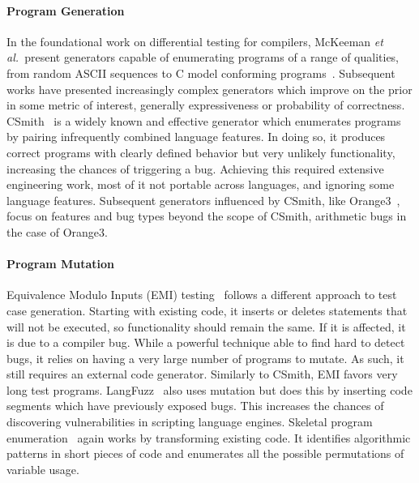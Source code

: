 \paragraph{Program Generation}

In the foundational work on differential testing for compilers, McKeeman \emph{et al.\ }present generators capable of enumerating programs of a range of qualities, from random ASCII sequences to C model conforming programs~\cite{McKeeman1998}. Subsequent works have presented increasingly complex generators which improve on the prior in some metric of interest, generally expressiveness or probability of correctness. CSmith~\cite{Yang2011} is a widely known and effective generator which enumerates programs by pairing infrequently combined language features. In doing so, it produces correct programs with clearly defined behavior but very unlikely functionality, increasing the chances of triggering a bug. Achieving this required extensive engineering work, most of it not portable across languages, and ignoring some language features. Subsequent generators influenced by CSmith, like Orange3~\cite{Nagai2013}, focus on features and bug types beyond the scope of CSmith, arithmetic bugs in the case of Orange3.

\paragraph{Program Mutation}

Equivalence Modulo Inputs (EMI) testing~\cite{Le2013a,Sun2016a} follows a different approach to test case generation. Starting with existing code, it inserts or deletes statements that will not be executed, so functionality should remain the same. If it is affected, it is due to a compiler bug. While a powerful technique able to find hard to detect bugs, it relies on having a very large number of programs to mutate. As such, it still requires an external code generator. Similarly to CSmith, EMI favors very long test programs. LangFuzz~\cite{Holler2012} also uses mutation but does this by inserting code segments which have previously exposed bugs. This increases the chances of discovering vulnerabilities in scripting language engines.
Skeletal program enumeration~\cite{Zhang2017a} again works by transforming existing code. It identifies algorithmic patterns in short pieces of code and enumerates all the possible permutations of variable usage.


